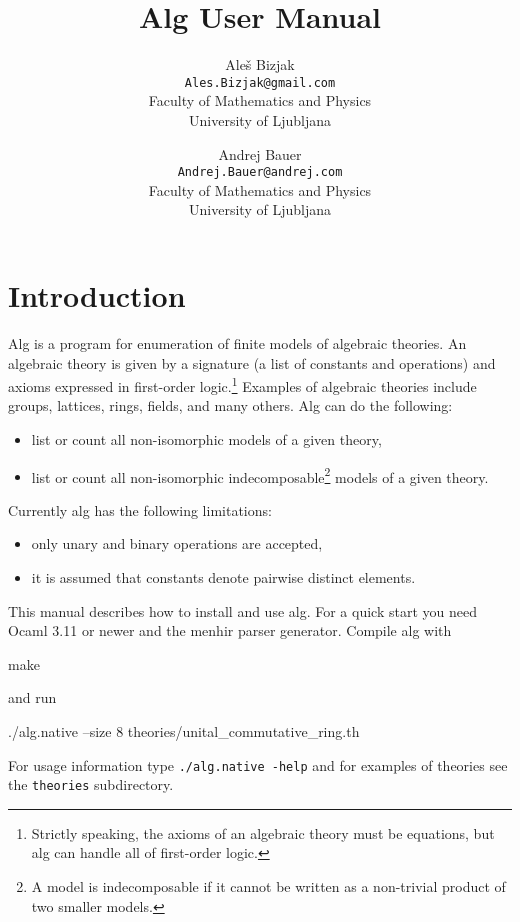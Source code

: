 \documentclass{report}
\begin{document}
\title{Alg User Manual}
\author{Ale\v{s} Bizjak\\
\texttt{Ales.Bizjak@gmail.com}\\
Faculty of Mathematics and Physics\\
University of Ljubljana
\and
Andrej Bauer\\
\texttt{Andrej.Bauer@andrej.com}\\
Faculty of Mathematics and Physics\\
University of Ljubljana}
\maketitle

\dominitoc
\tableofcontents

\chapter{Introduction}
\label{sec:introduction}

Alg is a program for enumeration of finite models of algebraic
theories. An algebraic theory is given by a signature (a list of
constants and operations) and axioms expressed in first-order
logic.\footnote{Strictly speaking, the axioms of an algebraic theory
  must be equations, but alg can handle all of first-order logic.}
Examples of algebraic theories include groups, lattices, rings,
fields, and many others. Alg can do the following:
%
\begin{itemize}
\item list or count all non-isomorphic models of a given theory,
\item list or count all non-isomorphic indecomposable\footnote{A model
  is indecomposable if it cannot be written as a non-trivial product
  of two smaller models.} models of a given theory.
\end{itemize}
%
Currently alg has the following limitations:
%
\begin{itemize}
\item only unary and binary operations are accepted,
\item it is assumed that constants denote pairwise distinct elements.
\end{itemize}
%
This manual describes how to install and use alg. For a quick start
you need Ocaml 3.11 or newer and the menhir parser generator. Compile
alg with
%
\begin{shell}
make
\end{shell}
%
and run
%
\begin{shell}
./alg.native --size 8 theories/unital_commutative_ring.th
\end{shell}
%
For usage information type \texttt{./alg.native -help} and for
examples of theories see the \texttt{theories} subdirectory.
\end{document}
